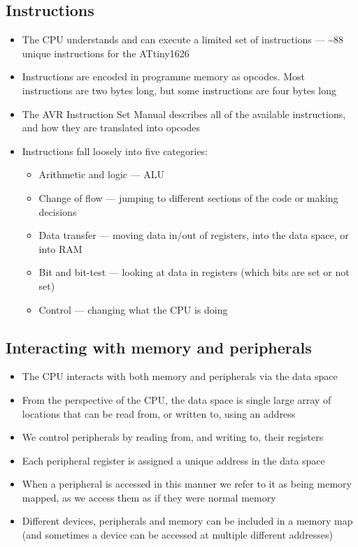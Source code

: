 \documentclass{article}
\begin{document}
\subsection{Instructions}
\begin{itemize}
    \item The CPU understands and can execute a limited set of instructions --- \textasciitilde88 unique instructions for the ATtiny1626
    \item Instructions are encoded in programme memory as opcodes. Most instructions are two bytes long, but some instructions are four bytes long
    \item The AVR Instruction Set Manual describes all of the available instructions, and how they are translated into opcodes
    \item Instructions fall loosely into five categories:
          \begin{itemize}
              \item Arithmetic and logic --- ALU
              \item Change of flow --- jumping to different sections of the code or making decisions
              \item Data transfer --- moving data in/out of registers, into the data space, or into RAM
              \item Bit and bit-test --- looking at data in registers (which bits are set or not set)
              \item Control --- changing what the CPU is doing
          \end{itemize}
\end{itemize}
\subsection{Interacting with memory and peripherals}
\begin{itemize}
    \item The CPU interacts with both memory and peripherals via the data space
    \item From the perspective of the CPU, the data space is single large array of
          locations that can be read from, or written to, using an address
    \item We control peripherals by reading from, and writing to, their registers
    \item Each peripheral register is assigned a unique address in the data space
    \item When a peripheral is accessed in this manner we refer to it as being
          memory mapped, as we access them as if they were normal memory
    \item Different devices, peripherals and memory can be included in a memory map
          (and sometimes a device can be accessed at multiple different addresses)
\end{itemize}
\end{document}
